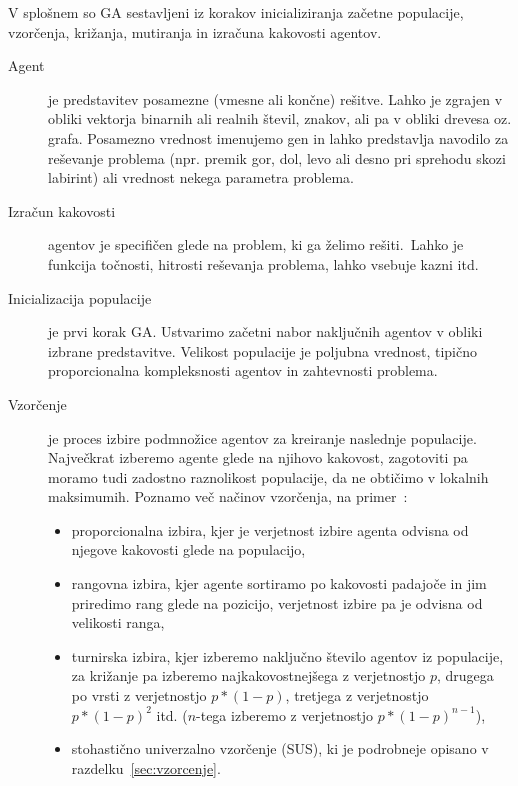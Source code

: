 \documentclass[a4paper,12pt,openright]{book}
\begin{document}
    V splošnem so GA sestavljeni iz korakov inicializiranja začetne populacije, vzorčenja, križanja, mutiranja in izračuna kakovosti agentov.
    \begin{description}
        \item[Agent]{je predstavitev posamezne (vmesne ali končne) rešitve. Lahko je zgrajen v obliki vektorja binarnih ali realnih
            števil, znakov, ali pa v obliki drevesa oz. grafa. Posamezno vrednost imenujemo gen in lahko predstavlja navodilo za
            reševanje problema (npr. premik gor, dol, levo ali desno pri sprehodu skozi labirint) ali vrednost nekega parametra problema.}
        \item[Izračun kakovosti]{agentov je specifičen glede na problem, ki ga želimo rešiti.\ Lahko je funkcija točnosti,
            hitrosti reševanja problema, lahko vsebuje kazni itd.}
        \item[Inicializacija populacije]{je prvi korak GA.
            Ustvarimo začetni nabor naključnih agentov v obliki izbrane predstavitve.
            Velikost populacije je poljubna vrednost, tipično proporcionalna kompleksnosti agentov in zahtevnosti problema.}
        \item[Vzorčenje]{je proces izbire podmnožice agentov za kreiranje naslednje populacije.
            Največkrat izberemo agente glede na njihovo kakovost, zagotoviti pa moramo tudi zadostno raznolikost populacije,
            da ne obtičimo v lokalnih maksimumih. Poznamo več načinov vzorčenja, na primer~\cite{inteligentni_sistemi_2010}:
            \begin{itemize}
                \item proporcionalna izbira, kjer je verjetnost izbire agenta odvisna od njegove kakovosti glede na populacijo,
                \item rangovna izbira, kjer agente sortiramo po kakovosti padajoče in jim priredimo rang glede na pozicijo, verjetnost izbire pa je odvisna od velikosti ranga,
                \item turnirska izbira, kjer izberemo naključno število agentov iz populacije, za križanje pa izberemo najkakovostnejšega
                z verjetnostjo $p$, drugega po vrsti z verjetnostjo $p*(1-p)$, tretjega z verjetnostjo $p*(1-p)^2$ itd.
                ($n$-tega izberemo z verjetnostjo $p*(1-p)^{n-1}$),
                \item stohastično univerzalno vzorčenje (SUS), ki je podrobneje opisano v razdelku~\ref{sec:vzorcenje}.

\end{itemize}}
\end{description}
\end{document}
